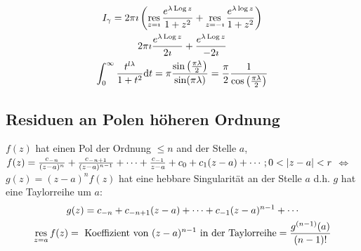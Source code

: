 \begin{bsp*}
\begin{gather*}
\begin{split}
		\end{split} \\
		I_{\gamma} = 2\pi\imath \left( \operatorname*{res}_{z=\imath} \frac{e^{\lambda \operatorname{Log} z}}{1 + z^2} + \operatorname*{res}_{z=-\imath} \frac{e^{\lambda \log z}}{1 + z^2} \right) \\
		2\pi\imath \frac{e^{\lambda \operatorname{Log} z}}{2\imath} + \frac{e^{\lambda \operatorname{Log} z}}{-2\imath} \\
		\int_0^{\infty} \frac{t^{l\lambda}}{1 + t^2} \dd t = \pi \frac{\sin\left( \frac{\pi\lambda}{2} \right)}{\sin(\pi\lambda)} = \frac{\pi}{2} \frac{1}{\cos\left(\frac{\pi\lambda}{2}\right)}
	\end{gather*}
\end{bsp*}

\subsection{Residuen an Polen höheren Ordnung}
$f(z)$ hat einen Pol der Ordnung $\leq n$ and der Stelle $a$, $f(z) = \frac{c_{-n}}{(z-a)^n} + \frac{c_{-n+1}}{(z-a)^{n-1}} + \dotsb + \frac{c_{-1}}{z-a} + c_0 + c_1 (z-a) + \dotsb ; 0 < \abs{z-a} < r$ $\iff$ $g(z) = (z-a)^n f(z)$ hat eine hebbare Singularität an der Stelle $a$ d.h. $g$ hat eine Taylorreihe um $a$:
\begin{gather*}
	g(z) = c_{-n} + c_{-n+1} (z-a) + \dotsb + c_{-1} (z-a)^{n-1} + \dotsb \\
	\operatorname*{res}_{z=a} f(z) = \text{ Koeffizient von } (z-a)^{n-1} \text{ in der Taylorreihe} = \frac{g^{(n-1)}(a)}{(n-1)!}
\end{gather*}
